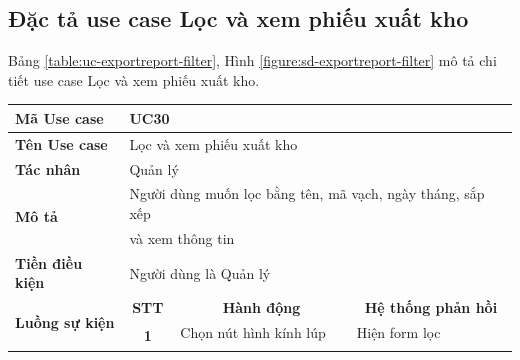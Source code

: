 \documentclass[../DoAn.tex]{subfiles}
\begin{document}
\subsection{Đặc tả use case Lọc và xem phiếu xuất kho}
\label{section:uc-exportreport-filter}
Bảng \ref{table:uc-exportreport-filter}, Hình \ref{figure:sd-exportreport-filter} mô tả chi tiết use case Lọc và xem phiếu xuất kho.
\begin{table}[H]
    \begin{tabular}{|l|c|l|l|}
        \hline
        \textbf{Mã Use case}                    & \multicolumn{3}{l|}{UC30}                                                                                                                                                   \\ \hline
        \textbf{Tên Use case}                   & \multicolumn{3}{l|}{Lọc và xem phiếu xuất kho}                                                                                                                              \\ \hline
        \textbf{Tác nhân}                       & \multicolumn{3}{l|}{Quản lý}                                                                                                                                                \\ \hline
        \multirow{2}{*}{\textbf{Mô tả} }        & \multicolumn{3}{l|}{Người dùng muốn lọc bằng tên, mã vạch, ngày tháng, sắp xếp}                                                                                             \\
                                                & \multicolumn{3}{l|}{và xem thông tin}                                                                                                                                       \\ \hline
        \textbf{Tiền điều kiện}                 & \multicolumn{3}{l|}{Người dùng là Quản lý}                                                                                                                                  \\ \hline
        \multirow{7}{*}{\textbf{Luồng sự kiện}} & \multicolumn{1}{c|}{\textbf{STT}}                                               & \multicolumn{1}{c|}{\textbf{Hành động}} & \multicolumn{1}{c|}{\textbf{Hệ thống phản hồi}} \\ \cline{2-4}
                                                & \multirow{6}{*}{\textbf{1}}                                                     & Chọn nút hình kính lúp                  & Hiện form lọc                                   \\ \cline{3-4}

\end{tabular}
\end{table}
\end{document}
